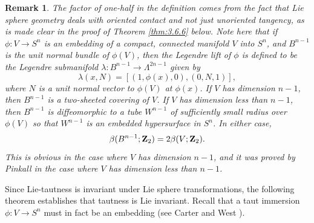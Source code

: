 \documentclass[12pt]{article}
\newtheorem{remark}{Remark}[section]
\begin{document}
\begin{remark}
\label{rem:3.6.7} 
{\rm The factor of one-half in the definition comes from the fact that Lie sphere geometry deals with oriented contact and 
not just unoriented tangency, as is made clear in the proof of Theorem \ref{thm:3.6.6} below.  
Note here that if
$\phi:V \rightarrow S^n$ is an embedding of a compact, connected manifold $V$ into $S^n$, and $B^{n-1}$ is the
unit normal bundle of $\phi (V)$, then the 
{\em Legendre lift} of $\phi$ is defined to be the Legendre submanifold
$\lambda: B^{n-1} \rightarrow \Lambda^{2n-1}$ given by
\begin{equation}
\label{eq:3.6.50}
\lambda(x,N) = [(1,\phi(x),0),(0,N,1)],
\end{equation}
where $N$ is a unit normal vector to $\phi(V)$ at $\phi(x)$.
If $V$ has dimension $n-1$, then $B^{n-1}$ is a two-sheeted covering of $V$.  If $V$ has dimension less than $n-1$,
then $B^{n-1}$ is diffeomorphic to a tube $W^{n-1}$ of sufficiently small radius over $\phi(V)$ so that $W^{n-1}$
is an embedded hypersurface in $S^n$.  In either case,
\begin{displaymath}
\beta(B^{n-1};{\bf Z}_2) = 2 \beta(V;{\bf Z}_2).
\end{displaymath}
This is obvious
in the case where $V$ has dimension $n-1$, and it was proved by Pinkall \cite{P5} in the case where $V$
has dimension less than $n-1$.} 
\end{remark}

Since Lie-tautness is invariant under Lie sphere transformations, the following theorem establishes
that tautness is Lie invariant.  Recall that a taut immersion $\phi:V \rightarrow S^n$ must in fact be an embedding
(see Carter and West \cite{CW1}).
\end{document}
